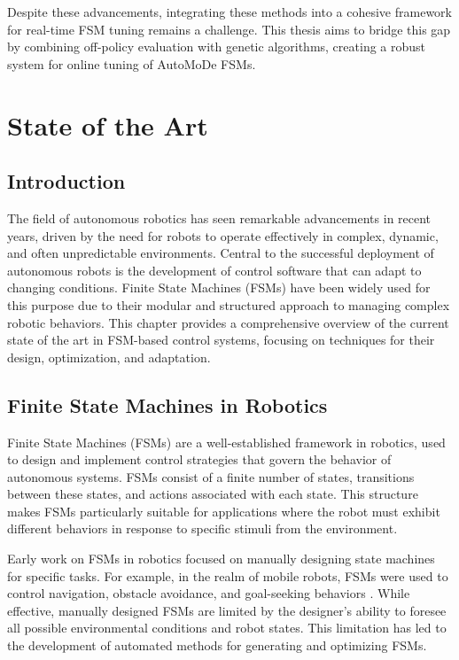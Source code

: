 \documentclass{ULBreport}
\begin{document}
Despite these advancements, integrating these methods into a cohesive framework for real-time FSM tuning remains a challenge. This thesis aims to bridge this gap by combining off-policy evaluation with genetic algorithms, creating a robust system for online tuning of AutoMoDe FSMs. 

\chapter{State of the Art}

\section{Introduction}
The field of autonomous robotics has seen remarkable advancements in recent years, driven by the need for robots to operate effectively in complex, dynamic, and often unpredictable environments. Central to the successful deployment of autonomous robots is the development of control software that can adapt to changing conditions. Finite State Machines (FSMs) have been widely used for this purpose due to their modular and structured approach to managing complex robotic behaviors. This chapter provides a comprehensive overview of the current state of the art in FSM-based control systems, focusing on techniques for their design, optimization, and adaptation.

\section{Finite State Machines in Robotics}
Finite State Machines (FSMs) are a well-established framework in robotics, used to design and implement control strategies that govern the behavior of autonomous systems. FSMs consist of a finite number of states, transitions between these states, and actions associated with each state. This structure makes FSMs particularly suitable for applications where the robot must exhibit different behaviors in response to specific stimuli from the environment.

Early work on FSMs in robotics focused on manually designing state machines for specific tasks. For example, in the realm of mobile robots, FSMs were used to control navigation, obstacle avoidance, and goal-seeking behaviors \cite{Brooks1991}. While effective, manually designed FSMs are limited by the designer's ability to foresee all possible environmental conditions and robot states. This limitation has led to the development of automated methods for generating and optimizing FSMs.
\end{document}
